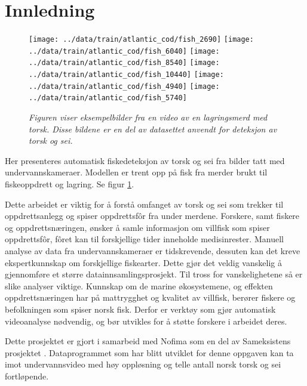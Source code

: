 \section{Innledning}




\begin{figure}[h!]
\begin{center} 
\texttt{[image: ../data/train/atlantic\_cod/fish\_2690]}
\texttt{[image: ../data/train/atlantic\_cod/fish\_6040]}
\texttt{[image: ../data/train/atlantic\_cod/fish\_8540]}
\texttt{[image: ../data/train/atlantic\_cod/fish\_10440]}
\texttt{[image: ../data/train/atlantic\_cod/fish\_4940]}
\texttt{[image: ../data/train/atlantic\_cod/fish\_5740]}
\caption{\small \sl Figuren viser eksempelbilder fra en video av en lagringsmerd med torsk. Disse bildene er en del av datasettet anvendt for deteksjon av torsk og sei. \label{fig:data}} 
\end{center} 
\end{figure} 

Her presenteres automatisk fiskedeteksjon av torsk og sei fra bilder tatt med undervannskameraer. Modellen er trent opp på fisk fra merder brukt til fiskeoppdrett og lagring. Se figur \ref{fig:data}.

Dette arbeidet er viktig for å forstå omfanget av torsk og sei som trekker til oppdrettsanlegg og spiser oppdrettsfôr fra under merdene. Forskere, samt fiskere og oppdrettsnæringen, ønsker å samle informasjon om villfisk som spiser oppdrettsfôr, fôret kan til forskjellige tider inneholde medisinrester. Manuell analyse av data fra undervannskameraer er tidskrevende, dessuten kan det kreve ekspertkunnskap om forskjellige fiskearter. Dette gjør det veldig vanskelig å gjennomføre et større datainnsamlingsprosjekt. Til tross for vanskelighetene så er slike analyser viktige. Kunnskap om de marine økosystemene, og effekten oppdrettsnæringen har på mattrygghet og kvalitet av villfisk, berører fiskere og befolkningen som spiser norsk fisk. Derfor er verktøy som gjør automatisk videoanalyse nødvendig, og bør utvikles for å støtte forskere i arbeidet deres.

Dette prosjektet er gjort i samarbeid med Nofima som en del av Sameksistens prosjektet \cite{Robertsen 2020}. Dataprogrammet som har blitt utviklet for denne oppgaven kan ta imot undervannsvideo med høy oppløsning og telle antall norsk torsk og sei fortløpende.

